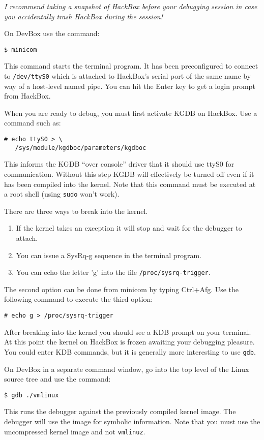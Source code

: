 \documentclass[twocolumn]{article}
\begin{document}
\emph{I recommend taking a snapshot of HackBox before your debugging session in case you
  accidentally trash HackBox during the session!}

On DevBox use the command:
\begin{Verbatim}
$ minicom
\end{Verbatim}
This command starts the terminal program. It has been preconfigured to connect to
\texttt{/dev/ttyS0} which is attached to HackBox's serial port of the same name by way of a
host-level named pipe. You can hit the Enter key to get a login prompt from HackBox.

When you are ready to debug, you must first activate KGDB on HackBox. Use a command such as:
\begin{Verbatim}
# echo ttyS0 > \
   /sys/module/kgdboc/parameters/kgdboc
\end{Verbatim}
This informs the KGDB ``over console'' driver that it should use ttyS0 for communication.
Without this step KGDB will effectively be turned off even if it has been compiled into the
kernel. Note that this command must be executed at a root shell (using \texttt{sudo} won't
work).

There are three ways to break into the kernel.
\begin{enumerate}
\item If the kernel takes an exception it will stop and wait for the debugger to attach.
\item You can issue a SysRq-g sequence in the terminal program.
\item You can echo the letter 'g' into the file \texttt{/proc/\-sysrq-trigger}.
\end{enumerate}

The second option can be done from minicom by typing Ctrl+Afg. Use the following command to
execute the third option:
\begin{Verbatim}
# echo g > /proc/sysrq-trigger
\end{Verbatim}

After breaking into the kernel you should see a KDB prompt on your terminal. At this point the
kernel on HackBox is frozen awaiting your debugging pleasure. You could enter KDB commands, but
it is generally more interesting to use \texttt{gdb}.

On DevBox in a separate command window, go into the top level of the Linux source tree and use
the command:
\begin{Verbatim}
$ gdb ./vmlinux
\end{Verbatim}
This runs the debugger against the previously compiled kernel image. The debugger will use the
image for symbolic information. Note that you must use the uncompressed kernel image and not
\texttt{vmlinuz}.
\end{document}
